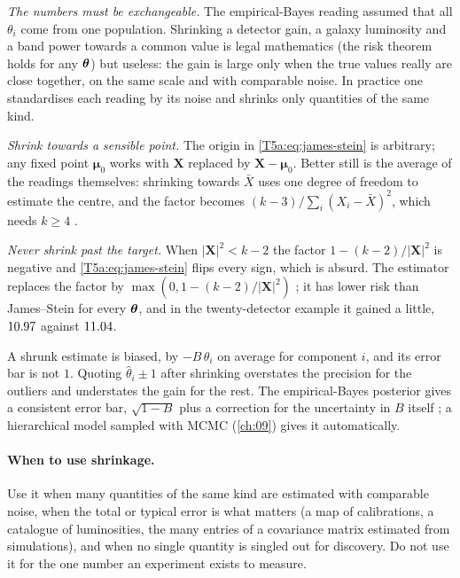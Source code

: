 \emph{The numbers must be exchangeable.} The empirical-Bayes reading assumed
that all $\theta_i$ come from one population. Shrinking a detector gain, a
galaxy luminosity and a band power towards a common value is legal
mathematics (the risk theorem holds for any $\bm{\theta}$) but useless: the
gain is large only when the true values really are close together, on the
same scale and with comparable noise. In practice one standardises each
reading by its noise and shrinks only quantities of the same kind.

\emph{Shrink towards a sensible point.} The origin in
\eqref{T5a:eq:james-stein} is arbitrary; any fixed point $\bm\mu_0$ works
with $\bm X$ replaced by $\bm X-\bm\mu_0$. Better still is the average of the
readings themselves: shrinking towards $\bar X$ uses one degree of freedom to
estimate the centre, and the factor becomes $(k-3)/\sum_i(X_i-\bar X)^2$,
which needs $k\ge4$ \cite{EfronMorris1975}.

\emph{Never shrink past the target.} When $|\bm X|^2<k-2$ the factor
$1-(k-2)/|\bm X|^2$ is negative and \eqref{T5a:eq:james-stein} flips every
sign, which is absurd. The  estimator replaces the
factor by $\max(0,1-(k-2)/|\bm X|^2)$ ; it has lower
risk than James--Stein for every $\bm{\theta}$, and in the twenty-detector example
it gained a little, $10.97$ against $11.04$.

\begin{pitfall}
A shrunk estimate is biased, by $-B\,\theta_i$ on average for component $i$,
and its error bar is not $1$. Quoting $\hat\theta_i\pm1$ after shrinking
overstates the precision for the outliers and understates the gain for the
rest. The empirical-Bayes posterior gives a consistent error bar,
$\sqrt{1-B}$ plus a correction for the uncertainty in $B$ itself
\cite{EfronMorris1975}; a hierarchical model sampled with MCMC
(\cref{ch:09}) gives it automatically.
\end{pitfall}

\paragraph{When to use shrinkage.}
Use it when many quantities of the same kind are estimated with comparable
noise, when the total or typical error is what matters (a map of
calibrations, a catalogue of luminosities, the many entries of a
covariance matrix estimated from simulations), and when no single quantity
is singled out for discovery. Do not use it for the one number an
experiment exists to measure.

